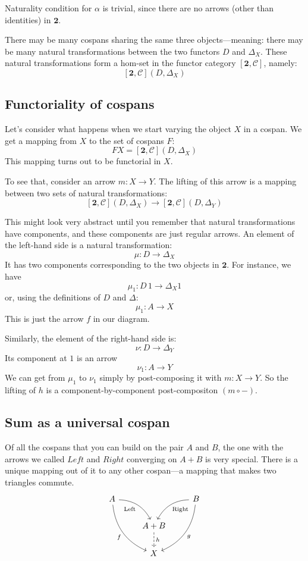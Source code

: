 \documentclass[DaoFP]{subfiles}
\begin{document}
Naturality condition for $\alpha$ is trivial, since there are no arrows (other than identities) in $\mathbf{2}$.

There may be many cospans sharing the same three objects---meaning: there may be many natural transformations between the two functors $D$ and  $\Delta_X$. These natural transformations form a hom-set in the functor category $[\mathbf{2}, \mathcal{C}]$, namely:
\[ [\mathbf{2}, \mathcal{C}](D, \Delta_X) \]

\subsection{Functoriality of cospans}

Let's consider what happens when we start varying the object $X$ in a cospan. We get a mapping from $X$ to the set of cospans $F$:
\[ F X = [\mathbf{2}, \mathcal{C}](D, \Delta_X) \]
This mapping turns out to be functorial in $X$.

To see that, consider an arrow $m \colon X \to Y$. The lifting of this arrow is a mapping between two sets of natural transformations:
\[ [\mathbf{2}, \mathcal{C}](D, \Delta_X) \to [\mathbf{2}, \mathcal{C}](D, \Delta_{Y}) \] 
 
This might look very abstract until you remember that natural transformations have components, and these components are just regular arrows. An element of the left-hand side is a natural transformation:
\[ \mu \colon D \to \Delta_X \]
It has two components corresponding to the two objects in $\mathbf{2}$. For instance, we have
\[ \mu_1 \colon D \, 1 \to \Delta_X 1 \]
or, using the definitions of $D$ and $\Delta$:
\[ \mu_1 \colon A \to X \]
This is just the arrow $f$ in our diagram. 

Similarly, the element of the right-hand side is:
\[ \nu \colon D \to \Delta_{Y} \]
Its component at $1$ is an arrow
\[ \nu_1 \colon A \to Y \]
We can get from $\mu_1$ to $\nu_1$ simply by post-composing it with $m \colon X \to Y$. So the lifting of $h$ is a component-by-component post-compositon $(m \circ -)$. 

\subsection{Sum as a universal cospan}

Of all the cospans that you can build on the pair $A$ and $B$, the one with the arrows we called $Left$ and $Right$ converging on $A + B$  is very special. There is a unique mapping out of it to any other cospan---a mapping that makes two triangles commute.  
\[
 \begin{tikzcd}
 A
 \arrow[dr,  bend left, "\text{Left}"']
 \arrow[ddr, bend right, "f"']
 && B
 \arrow[dl, bend right, "\text{Right}"]
 \arrow[ddl, bend left, "g"]
 \\
&A + B
\arrow[d, dashed, "h"]
\\
& X
 \end{tikzcd}
\]
\end{document}

